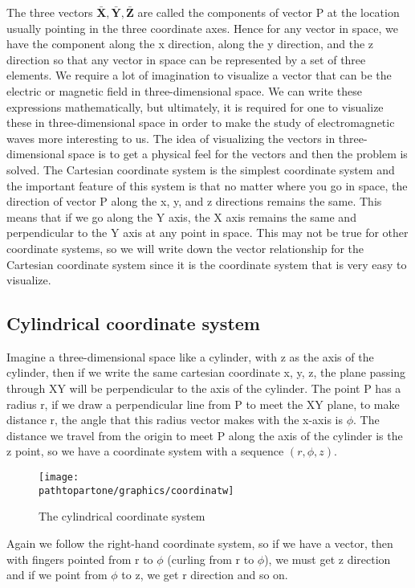 The three vectors $\mathbf{\bar{X}, \bar{Y}, \bar{Z}}$ are called the components of vector P at the location usually pointing in the three coordinate axes. Hence for any vector in space, we have the component along the x direction, along the y direction, and the z direction so that any vector in space can be represented by a set of three elements. We require a lot of imagination to visualize a vector that can be the electric or magnetic field in three-dimensional space. We can write these expressions mathematically, but ultimately, it is required for one to visualize these in three-dimensional space in order to make the study of electromagnetic waves more interesting to us. The idea of visualizing the vectors in three-dimensional space is to get a physical feel for the vectors and then the problem is solved. The Cartesian coordinate system is the simplest coordinate system and the important feature of this system is that no matter where you go in space, the direction of vector P along the x, y, and z directions remains the same. This means that if we go along the Y axis, the X axis remains the same and perpendicular to the Y axis at any point in space. This may not be true for other coordinate systems, so we will write down the vector relationship for the Cartesian coordinate system since it is the coordinate system that is very easy to visualize. 

\subsection{Cylindrical coordinate system}    
Imagine a three-dimensional space like a cylinder, with z as the axis of the cylinder, then if we write the same cartesian coordinate x, y, z, the plane passing through XY will be perpendicular to the axis of the cylinder. The point P has a radius r, if we draw a perpendicular line from P to meet the XY plane, to make distance r, the angle that this radius vector makes with the x-axis is $\phi$. The distance we travel from the origin to meet P along the axis of the cylinder is the z point, so we have a coordinate system with a sequence $( r, \phi, z)$.
\begin{figure}[h]
\centering
\texttt{[image: \\pathtopartone/graphics/coordinatw]}
\caption{The cylindrical coordinate system}
\end{figure} 

 Again we follow the right-hand coordinate system, so if we have a vector, then with fingers pointed from r to $\phi $ (curling from r to $\phi$), we must get z direction and if we point from $\phi$ to z, we get r direction and so on.

